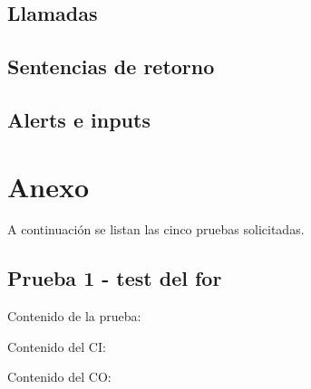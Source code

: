 \documentclass[11pt, , a4paper, titlepage]{article}
\newenvironment{changemargin}[2]{%
\begin{list}{}{%
\setlength{\topsep}{0pt}%
\setlength{\leftmargin}{#1}%
\setlength{\rightmargin}{#2}%
\setlength{\listparindent}{\parindent}%
\setlength{\itemindent}{\parindent}%
\setlength{\parsep}{\parskip}%
}%
\item[]}{\end{list}}
\begin{document}
\subsection{Llamadas}
 
\subsection{Sentencias de retorno}

\subsection{Alerts e inputs}

\clearpage
\section{Anexo}
A continuación se listan las cinco pruebas solicitadas.


\subsection{Prueba 1 - test del for}
\vspace{2mm}
Contenido de la prueba:
\vspace{2mm}
\begin{changemargin}{+3cm}{+2cm}
    
\end{changemargin} 
\vspace{2mm}
Contenido del CI:
\vspace{2mm}
\begin{changemargin}{+1cm}{+0cm}
    
\end{changemargin} 
\vspace{2mm}
Contenido del CO:
\vspace{2mm}
\begin{changemargin}{+1cm}{-2cm}
    
\end{changemargin} 

\clearpage
\end{document}
